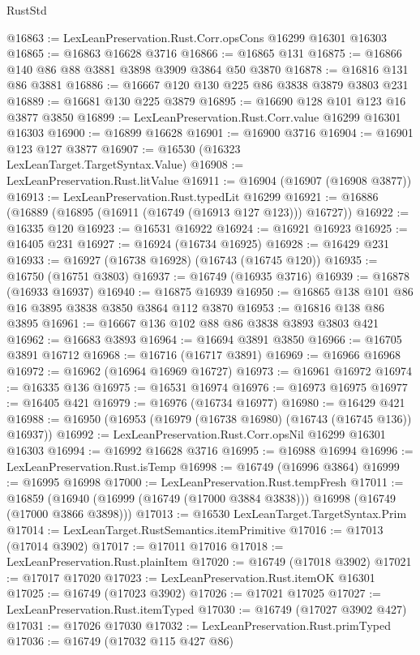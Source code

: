 \begin{lexlean}{RustStd}
\begin{coremodule}
@16863 := LexLeanPreservation.Rust.Corr.opsCons @16299 @16301 @16303
@16865 := @16863 @16628 @3716
@16866 := @16865 @131
@16875 := @16866 @140 @86 @88 @3881 @3898 @3909 @3864 @50 @3870
@16878 := @16816 @131 @86 @3881
@16886 := @16667 @120 @130 @225 @86 @3838 @3879 @3803 @231
@16889 := @16681 @130 @225 @3879
@16895 := @16690 @128 @101 @123 @16 @3877 @3850
@16899 := LexLeanPreservation.Rust.Corr.value @16299 @16301 @16303
@16900 := @16899 @16628
@16901 := @16900 @3716
@16904 := @16901 @123 @127 @3877
@16907 := @16530 (@16323 LexLeanTarget.TargetSyntax.Value)
@16908 := LexLeanPreservation.Rust.litValue
@16911 := @16904 (@16907 (@16908 @3877))
@16913 := LexLeanPreservation.Rust.typedLit @16299
@16921 := @16886 (@16889 (@16895 (@16911 (@16749 (@16913 @127 @123))) @16727))
@16922 := @16335 @120
@16923 := @16531 @16922
@16924 := @16921 @16923
@16925 := @16405 @231
@16927 := @16924 (@16734 @16925)
@16928 := @16429 @231
@16933 := @16927 (@16738 @16928) (@16743 (@16745 @120))
@16935 := @16750 (@16751 @3803)
@16937 := @16749 (@16935 @3716)
@16939 := @16878 (@16933 @16937)
@16940 := @16875 @16939
@16950 := @16865 @138 @101 @86 @16 @3895 @3838 @3850 @3864 @112 @3870
@16953 := @16816 @138 @86 @3895
@16961 := @16667 @136 @102 @88 @86 @3838 @3893 @3803 @421
@16962 := @16683 @3893
@16964 := @16694 @3891 @3850
@16966 := @16705 @3891 @16712
@16968 := @16716 (@16717 @3891)
@16969 := @16966 @16968
@16972 := @16962 (@16964 @16969 @16727)
@16973 := @16961 @16972
@16974 := @16335 @136
@16975 := @16531 @16974
@16976 := @16973 @16975
@16977 := @16405 @421
@16979 := @16976 (@16734 @16977)
@16980 := @16429 @421
@16988 := @16950 (@16953 (@16979 (@16738 @16980) (@16743 (@16745 @136)) @16937))
@16992 := LexLeanPreservation.Rust.Corr.opsNil @16299 @16301 @16303
@16994 := @16992 @16628 @3716
@16995 := @16988 @16994
@16996 := LexLeanPreservation.Rust.isTemp
@16998 := @16749 (@16996 @3864)
@16999 := @16995 @16998
@17000 := LexLeanPreservation.Rust.tempFresh
@17011 := @16859
    (@16940 (@16999 (@16749 (@17000 @3884 @3838))) @16998 (@16749 (@17000 @3866 @3898)))
@17013 := @16530 LexLeanTarget.TargetSyntax.Prim
@17014 := LexLeanTarget.RustSemantics.itemPrimitive
@17016 := @17013 (@17014 @3902)
@17017 := @17011 @17016
@17018 := LexLeanPreservation.Rust.plainItem
@17020 := @16749 (@17018 @3902)
@17021 := @17017 @17020
@17023 := LexLeanPreservation.Rust.itemOK @16301
@17025 := @16749 (@17023 @3902)
@17026 := @17021 @17025
@17027 := LexLeanPreservation.Rust.itemTyped
@17030 := @16749 (@17027 @3902 @427)
@17031 := @17026 @17030
@17032 := LexLeanPreservation.Rust.primTyped
@17036 := @16749 (@17032 @115 @427 @86)

\end{coremodule}
\end{lexlean}
